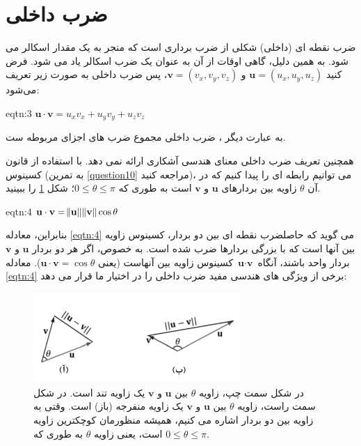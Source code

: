 \section{\textbf{ضرب داخلی}}
\label{sec:3}
{
    \Large
    \begin{spacing}{1.5}
        ضرب نقطه ای (داخلی) شکلی از ضرب برداری است که منجر به یک مقدار اسکالر می شود.
        به همین دلیل، گاهی اوقات از آن به عنوان یک ضرب اسکالر یاد می شود.
        فرض کنید $\textbf{u}=(u_{x},u_{y},u_{z})$ و  $\textbf{v}=(v_{x},v_{y},v_{z})$،
        پس ضرب داخلی به صورت زیر تعریف می‌شود:

        \begin{eqtn}{eqtn:3}
            \centering
            \LARGE
            $\textbf{u}\cdot\textbf{v}=u_{x}v_{x}+u_{y}v_{y}+u_{z}v_{z}$
        \end{eqtn}

        به عبارت دیگر ، ضرب داخلی مجموع ضرب های اجزای مربوطه ست.

        همچنین تعریف ضرب داخلی معنای هندسی آشکاری ارائه نمی دهد.
        با استفاده از قانون کسینوس (به تمرین \ref{question10} مراجعه کنید)، می توانیم رابطه ای را پیدا کنیم که در آن $\theta$ زاویه بین بردارهای $\textbf{u}$ و $\textbf{v}$ است به طوری که $0\leq\theta\leq\pi$؛ شکل \ref{fig:4.Session.1.1.9} را ببینید.

        \begin{eqtn}{eqtn:4}
            \centering
            \LARGE
            $\textbf{u}\cdot\textbf{v}=\norm{\textbf{u}}\norm{\textbf{v}}\cos\theta$
        \end{eqtn}

        بنابراین، معادله \ref{eqtn:4} می گوید که حاصلضرب نقطه ای بین دو بردار، کسینوس زاویه بین آنها است که با بزرگی بردارها ضرب شده است.
        به خصوص، اگر هر دو بردار $\textbf{u}$ و $\textbf{v}$ بردار واحد باشند،
        آنگاه $\textbf{u}\cdot\textbf{v}$ کسینوس زاویه بین آنهاست (یعنی $\textbf{u}\cdot\textbf{v}=\cos\theta$).
        معادله \ref{eqtn:4} برخی از ویژگی های هندسی مفید ضرب داخلی را در اختیار ما قرار می دهد:

        \begin{figure}[H]
            \centering
            \setlength{\belowcaptionskip}{-10pt}
            \includegraphics[width=0.7\textwidth]{Images/4/4.Session.1.1.9}
            \caption{در شکل سمت چپ، زاویه $\theta$ بین $\textbf{u}$ و $\textbf{v}$ یک زاویه تند است.
            در شکل سمت راست، زاویه $\theta$ بین $\textbf{u}$ و $\textbf{v}$ یک زاویه منفرجه (باز) است.
            وقتی به زاویه بین دو بردار اشاره می کنیم، همیشه منظورمان کوچکترین زاویه است،
            یعنی زاویه $\theta$ به طوری که $0\leq\theta\leq\pi$.}
            \label{fig:4.Session.1.1.9}
        \end{figure}


\end{spacing}}
